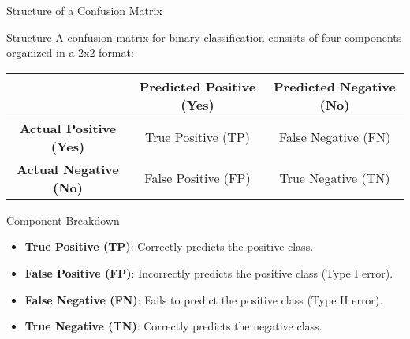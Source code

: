 \documentclass[aspectratio=169]{beamer}
\begin{document}
\begin{frame}[fragile]{Structure of a Confusion Matrix}
    \begin{block}{Structure}
        A confusion matrix for binary classification consists of four components organized in a 2x2 format:
        \begin{center}
        \begin{tabular}{|c|c|c|}
            \hline
            & \textbf{Predicted Positive (Yes)} & \textbf{Predicted Negative (No)} \\
            \hline
            \textbf{Actual Positive (Yes)} & True Positive (TP) & False Negative (FN) \\
            \hline
            \textbf{Actual Negative (No)} & False Positive (FP) & True Negative (TN) \\
            \hline
        \end{tabular}
        \end{center}
    \end{block}
    
    \begin{block}{Component Breakdown}
        \begin{itemize}
            \item \textbf{True Positive (TP)}: Correctly predicts the positive class.
            \item \textbf{False Positive (FP)}: Incorrectly predicts the positive class (Type I error).
            \item \textbf{False Negative (FN)}: Fails to predict the positive class (Type II error).
            \item \textbf{True Negative (TN)}: Correctly predicts the negative class.
        \end{itemize}
    \end{block}
\end{frame}
\end{document}
